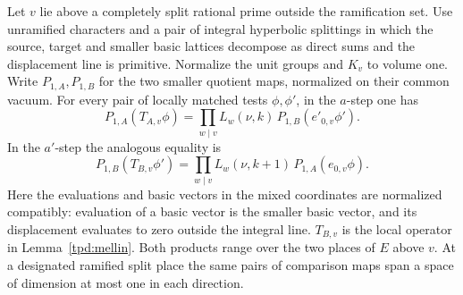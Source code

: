 \begin{proposition}
\label{threal:localcone}
Let \(v\) lie above a completely split rational prime outside the
ramification set. Use unramified characters and a pair of integral
hyperbolic splittings in which the source, target and smaller basic
lattices decompose as direct sums and the displacement line is
primitive. Normalize the unit groups and \(K_v\) to volume one.
Write \(P_{1,A},P_{1,B}\) for the two smaller quotient maps,
normalized on their common vacuum. For every pair of locally
matched tests \(\phi,\phi'\), in the \(a\)-step one has
\[
   P_{1,A}(T_{A,v}\phi)=
    \prod_{w\mid v}L_w(\nu,k)\, P_{1,B}(e'_{0,v}\phi').
\]
In the \(a'\)-step the analogous equality is
\[
   P_{1,B}(T_{B,v}\phi')=
    \prod_{w\mid v}L_w(\nu,k+1)\, P_{1,A}(e_{0,v}\phi).
\]
Here the evaluations and basic vectors in the mixed coordinates
are normalized compatibly: evaluation of a basic vector is the
smaller basic vector, and its displacement evaluates to zero
outside the integral line. \(T_{B,v}\) is the local operator in
Lemma~\ref{tpd:mellin}. Both products range over the two places
of \(E\) above \(v\).
At a designated ramified split place the same pairs of comparison
maps span a space of dimension at most one in each direction.
\end{proposition}
